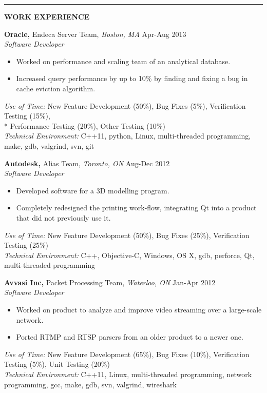 \documentclass{letter}
\begin{document}
\vskip 2pt
\hrule
{\large\bf WORK EXPERIENCE}

{\large\bf Oracle,} Endeca Server Team, {\sl Boston, MA} \hfill Apr-Aug 2013 \\
{\sl Software Developer}
\begin{itemize}
  \item Worked on performance and scaling team of an analytical database.
  \item Increased query performance by up to 10\% by finding and fixing a bug in cache eviction algorithm.
\end{itemize}
\emph{Use of Time:} New Feature Development (50\%), Bug Fixes (5\%), Verification Testing (15\%), \\* Performance Testing (20\%), Other Testing (10\%) \\
\emph{Technical Environment:} C++11, python, Linux, multi-threaded programming, make, gdb, valgrind, svn, git

{\large\bf Autodesk,} Alias Team, {\sl Toronto, ON} \hfill Aug-Dec 2012 \\
{\sl Software Developer}
\begin{itemize}
  \item Developed software for a 3D modelling program.
  \item Completely redesigned the printing work-flow, integrating Qt into a product that did not previously use it.
\end{itemize}
\emph{Use of Time:} New Feature Development (50\%), Bug Fixes (25\%), Verification Testing (25\%) \\
\emph{Technical Environment:} C++, Objective-C, Windows, OS X, gdb, perforce, Qt, multi-threaded programming

{\large\bf Avvasi Inc,} Packet Processing Team, {\sl Waterloo, ON} \hfill Jan-Apr 2012 \\
{\sl Software Developer}
\begin{itemize}
  \item Worked on product to analyze and improve video streaming over a large-scale network.
  \item Ported RTMP and RTSP parsers from an older product to a newer one.
\end{itemize}
\emph{Use of Time:} New Feature Development (65\%), Bug Fixes (10\%), Verification Testing (5\%), Unit Testing (20\%) \\
\emph{Technical Environment:} C++11, Linux, multi-threaded programming, network programming, gcc, make, gdb, svn, valgrind, wireshark
\end{document}
